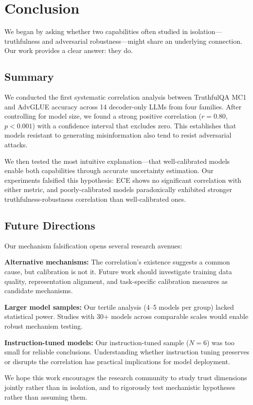 \section{Conclusion}
\label{sec:conclusion}

We began by asking whether two capabilities often studied in isolation---truthfulness and adversarial robustness---might share an underlying connection. Our work provides a clear answer: they do.

\subsection{Summary}

We conducted the first systematic correlation analysis between TruthfulQA MC1 and AdvGLUE accuracy across 14 decoder-only LLMs from four families. After controlling for model size, we found a strong positive correlation ($r=0.80$, $p<0.001$) with a confidence interval that excludes zero. This establishes that models resistant to generating misinformation also tend to resist adversarial attacks.

We then tested the most intuitive explanation---that well-calibrated models enable both capabilities through accurate uncertainty estimation. Our experiments falsified this hypothesis: ECE shows no significant correlation with either metric, and poorly-calibrated models paradoxically exhibited stronger truthfulness-robustness correlation than well-calibrated ones.

\subsection{Future Directions}

Our mechanism falsification opens several research avenues:

\textbf{Alternative mechanisms:} The correlation's existence suggests a common cause, but calibration is not it. Future work should investigate training data quality, representation alignment, and task-specific calibration measures as candidate mechanisms.

\textbf{Larger model samples:} Our tertile analysis (4--5 models per group) lacked statistical power. Studies with 30+ models across comparable scales would enable robust mechanism testing.

\textbf{Instruction-tuned models:} Our instruction-tuned sample ($N=6$) was too small for reliable conclusions. Understanding whether instruction tuning preserves or disrupts the correlation has practical implications for model deployment.

We hope this work encourages the research community to study trust dimensions jointly rather than in isolation, and to rigorously test mechanistic hypotheses rather than assuming them.
